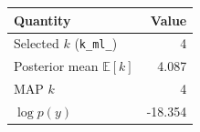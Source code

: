\begin{tabular}{lr}\toprule
Quantity & Value\\\midrule
Selected $k$ (\texttt{k\_ml\_}) & 4\\
Posterior mean $\mathbb{E}[k]$ & 4.087\\
MAP $k$ & 4\\
$\log p(y)$ & -18.354\\
\bottomrule\end{tabular}
